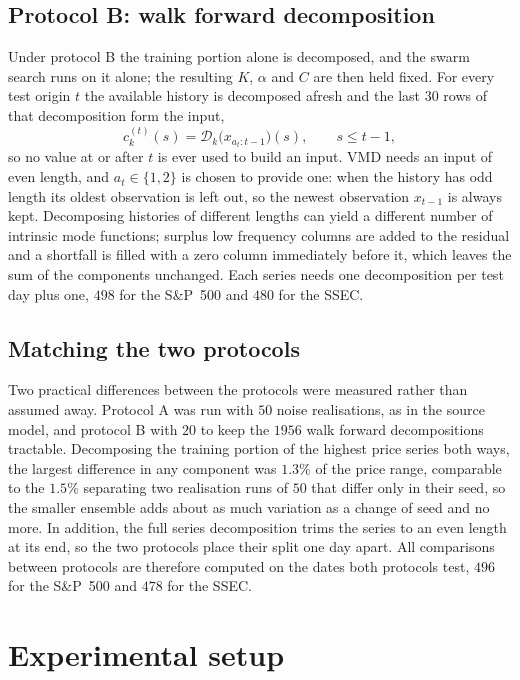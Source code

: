 \documentclass[pdflatex,sn-mathphys-num]{sn-jnl}%
\theoremstyle{thmstyleone}%
\theoremstyle{thmstyletwo}%
\theoremstyle{thmstylethree}%
\begin{document}
\subsection{Protocol B: walk forward decomposition}
Under protocol B the training portion alone is decomposed, and the swarm
search runs on it alone; the resulting $K$, $\alpha$ and $C$ are then held
fixed. For every test origin $t$ the available history is decomposed afresh
and the last $30$ rows of that decomposition form the input,
\begin{equation}
c_k^{(t)}(s)=\mathcal{D}_k\bigl(x_{a_t:t-1}\bigr)(s),\qquad s\le t-1,
\label{eq:walkforward}
\end{equation}
so no value at or after $t$ is ever used to build an input. VMD needs an input
of even length, and $a_t\in\{1,2\}$ is chosen to provide one: when the history
has odd length its oldest observation is left out, so the newest observation
$x_{t-1}$ is always kept. Decomposing histories of different lengths can yield
a different number of intrinsic mode functions; surplus low frequency columns
are added to the residual and a shortfall is filled with a zero column
immediately before it, which leaves the sum of the components unchanged. Each
series needs one decomposition per test day plus one, $498$ for the S\&P~500
and $480$ for the SSEC.

\subsection{Matching the two protocols}
Two practical differences between the protocols were measured rather than
assumed away. Protocol A was run with $50$ noise realisations, as in the
source model, and protocol B with $20$ to keep the $1956$ walk forward
decompositions tractable. Decomposing the training portion of the highest
price series both ways, the largest difference in any component was $1.3\%$
of the price range, comparable to the $1.5\%$ separating two realisation runs
of $50$ that differ only in their seed, so the smaller ensemble adds about as
much variation as a change of seed and no more. In addition, the full series
decomposition trims the series to an even length at its end, so the two
protocols place their split one day apart. All comparisons between protocols
are therefore computed on the dates both protocols test, $496$ for the
S\&P~500 and $478$ for the SSEC.

\section{Experimental setup}\label{sec:setup}
\end{document}
